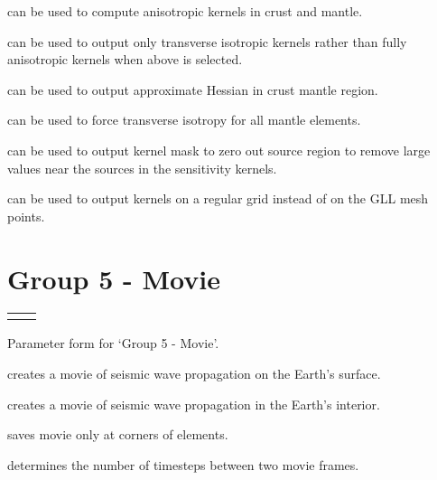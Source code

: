 \documentclass[english]{book}
\begin{document}
 can be used to compute anisotropic kernels in crust
and mantle.

 can be used to output only transverse
isotropic kernels rather than fully anisotropic kernels when
 above is selected.

 can be used to output approximate Hessian in
crust mantle region.

 can be used to force transverse isotropy for
all mantle elements.

 can be used to output kernel mask to zero out
source region to remove large values near the sources in the sensitivity
kernels.

 can be used to output kernels on a regular grid
instead of on the GLL mesh points.


\section{Group 5 - Movie}
\label{\detokenize{Appendix2:a2-6-group-5-movie}}

\begin{savenotes}\sphinxattablestart
\centering
\begin{tabulary}{\linewidth}[t]{T T}


&
\\
\end{tabulary}
\par
\sphinxattableend\end{savenotes}

\begin{center} Parameter form for ‘Group 5 - Movie’.
\end{center}
 creates a movie of seismic wave propagation on the
Earth’s surface.

 creates a movie of seismic wave propagation in the
Earth’s interior.

 saves movie only at corners of elements.

 determines the number of timesteps between
two movie frames.
\end{document}
